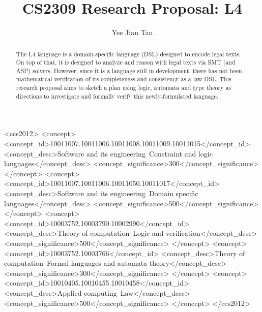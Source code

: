 \documentclass[11pt, sigconf]{acmart}
\begin{document}
\title{CS2309 Research Proposal: L4}

\author{Yee Jian Tan}

\begin{abstract}
  The L4 language is a domain-specific language (DSL) designed to encode legal
  texts. On top of that, it is designed to analyze and reason with legal texts
  via SMT (and ASP) solvers. However, since it is a language still in
  development, there has not been mathematical verification of its completeness
  and consistency as a law DSL. This research proposal aims to sketch a plan
  using logic, automata and type theory as directions to investigate and
  formally verify this newly-formulated language.

\end{abstract}

\begin{CCSXML}
<ccs2012>
   <concept>
       <concept_id>10011007.10011006.10011008.10011009.10011015</concept_id>
       <concept_desc>Software and its engineering~Constraint and logic languages</concept_desc>
       <concept_significance>300</concept_significance>
       </concept>
   <concept>
       <concept_id>10011007.10011006.10011050.10011017</concept_id>
       <concept_desc>Software and its engineering~Domain specific languages</concept_desc>
       <concept_significance>500</concept_significance>
       </concept>
   <concept>
       <concept_id>10003752.10003790.10002990</concept_id>
       <concept_desc>Theory of computation~Logic and verification</concept_desc>
       <concept_significance>500</concept_significance>
       </concept>
   <concept>
       <concept_id>10003752.10003766</concept_id>
       <concept_desc>Theory of computation~Formal languages and automata theory</concept_desc>
       <concept_significance>300</concept_significance>
       </concept>
   <concept>
       <concept_id>10010405.10010455.10010458</concept_id>
       <concept_desc>Applied computing~Law</concept_desc>
       <concept_significance>500</concept_significance>
       </concept>
 </ccs2012>
\end{CCSXML}
\end{document}
